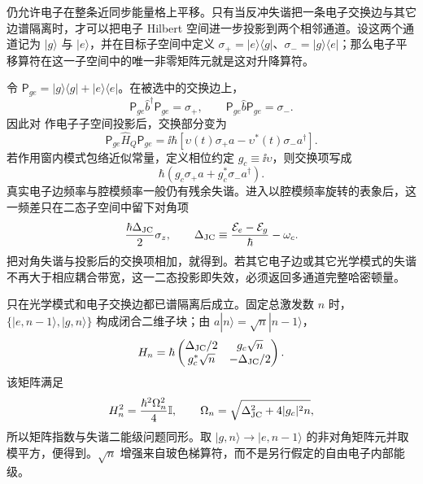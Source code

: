 \begin{exbox}
\medskip

 仍允许电子在整条近同步能量格上平移。只有当反冲失谐把一条电子交换边与其它边谱隔离时，才可以把电子 Hilbert 空间进一步投影到两个相邻通道。设这两个通道记为 $|g\rangle$ 与 $|e\rangle$，并在目标子空间中定义 $\sigma_+=|e\rangle\langle g|$、$\sigma_-=|g\rangle\langle e|$；那么电子平移算符在这一子空间中的唯一非零矩阵元就是这对升降算符。

令 $\mathsf P_{ge}=|g\rangle\langle g|+|e\rangle\langle e|$。在被选中的交换边上，
\begin{equation*}
 \mathsf P_{ge}\hat b^\dagger\mathsf P_{ge}=\sigma_+,
 \qquad
 \mathsf P_{ge}\hat b\mathsf P_{ge}=\sigma_-.
\end{equation*}
因此对 作电子子空间投影后，交换部分变为
\begin{equation*}
 \mathsf P_{ge}\hat H_Q\mathsf P_{ge}
 =\ii\hbar\left[\upsilon(t)\sigma_+a
 -\upsilon^*(t)\sigma_-a^\dagger\right].
\end{equation*}
若作用窗内模式包络近似常量，定义相位约定 $g_c\equiv\ii\upsilon$，则交换项写成
\begin{equation*}
 \hbar\left(g_c\sigma_+a+g_c^*\sigma_-a^\dagger\right).
\end{equation*}
真实电子边频率与腔模频率一般仍有残余失谐。进入以腔模频率旋转的表象后，这一频差只在二态子空间中留下对角项
\begin{equation*}
 \frac{\hbar\Delta_{\rm JC}}{2}\sigma_z,
 \qquad
 \Delta_{\rm JC}
 \equiv\frac{\mathcal E_e-\mathcal E_g}{\hbar}-\omega_c.
\end{equation*}
把对角失谐与投影后的交换项相加，就得到。若其它电子边或其它光学模式的失谐不再大于相应耦合带宽，这一二态投影即失效，必须返回多通道完整哈密顿量。

\medskip

 只在光学模式和电子交换边都已谱隔离后成立。固定总激发数 $n$ 时，$\{|e,n-1\rangle,|g,n\rangle\}$ 构成闭合二维子块；由 $a|n\rangle=\sqrt n|n-1\rangle$，
\[
H_n=\hbar
\begin{pmatrix}
\Delta_{\rm JC}/2&g_c\sqrt n\\
g_c^*\sqrt n&-\Delta_{\rm JC}/2
\end{pmatrix}.
\]
该矩阵满足
\[
H_n^2=\frac{\hbar^2\Omega_n^2}{4}\mathbb I,
\qquad
\Omega_n=\sqrt{\Delta_{\rm JC}^2+4|g_c|^2n},
\]
所以矩阵指数与失谐二能级问题同形。取 $|g,n\rangle\to|e,n-1\rangle$ 的非对角矩阵元并取模平方，便得到。$\sqrt n$ 增强来自玻色梯算符，而不是另行假定的自由电子内部能级。
\end{exbox}




